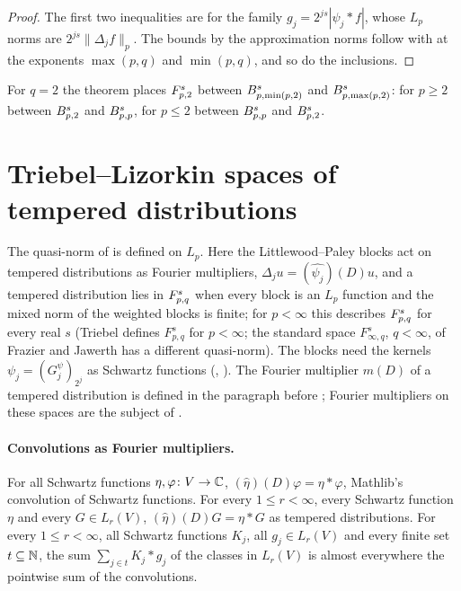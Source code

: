 \begin{proof}
\leanok
The first two inequalities are  for the family
$g_j = 2^{js} |\psi_j * f|$, whose $L_p$ norms are $2^{js} \|\Delta_j f\|_p$. The bounds by the
approximation norms follow with  at the exponents $\max(p,q)$ and
$\min(p,q)$, and so do the inclusions.
\end{proof}

For $q = 2$ the theorem places $F^{s}_{p,2}$ between $B^{s}_{p,\min(p,2)}$ and
$B^{s}_{p,\max(p,2)}$: for $p \geq 2$ between $B^{s}_{p,2}$ and $B^{s}_{p,p}$, for
$p \leq 2$ between $B^{s}_{p,p}$ and $B^{s}_{p,2}$.

\section{Triebel--Lizorkin spaces of tempered distributions}
\label{sec:tl-distributions}

The quasi-norm of  is defined on $L_p$. Here the Littlewood--Paley
blocks act on tempered distributions as Fourier multipliers, $\Delta_j u = (\widehat{\psi_j})(D) u$,
and a tempered distribution lies in $F^{s}_{p,q}$ when every block is an $L_p$ function and the
mixed norm of the weighted blocks is finite; for $p < \infty$ this describes $F^{s}_{p,q}$ for
every real $s$ (Triebel defines $F^s_{p,q}$ for $p < \infty$; the standard space
$F^s_{\infty,q}$, $q < \infty$, of Frazier and Jawerth has a different quasi-norm). The
blocks need the kernels $\psi_j = (G^\psi_j)_{2^j}$ as Schwartz functions (,
). The Fourier multiplier $m(D)$ of a tempered distribution is defined
in the paragraph before ; Fourier multipliers on these spaces
are the subject of .

\paragraph{Convolutions as Fourier multipliers.}

\begin{lemma}
\label{lem:conv-fourier-multiplier}
\leanok
{}
For all Schwartz functions $\eta, \varphi \colon V \to \mathbb{C}$,
$(\widehat\eta)(D) \varphi = \eta * \varphi$, Mathlib's convolution of Schwartz functions. For
every $1 \leq r < \infty$, every Schwartz function $\eta$ and every $G \in L_r(V)$,
$(\widehat\eta)(D) G = \eta * G$ as tempered distributions. For every $1 \leq r < \infty$, all
Schwartz functions $K_j$, all $g_j \in L_r(V)$ and every finite set $t \subseteq \mathbb{N}$, the sum
$\sum_{j \in t} K_j * g_j$ of the classes in $L_r(V)$ is almost everywhere the pointwise sum of
the convolutions.
\end{lemma}

